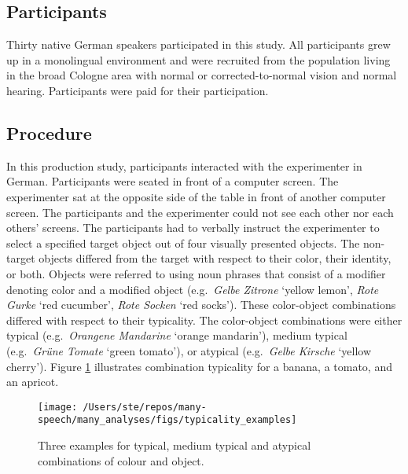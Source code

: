 \documentclass[
  12pt,
]{article}
\begin{document}
\hypertarget{participants}{%
\subsection{Participants}\label{participants}}

Thirty native German speakers participated in this study.
All participants grew up in a monolingual environment and were recruited from the population living in the broad Cologne area with normal or corrected-to-normal vision and normal hearing.
Participants were paid for their participation.

\hypertarget{procedure}{%
\subsection{Procedure}\label{procedure}}

In this production study, participants interacted with the experimenter in German.
Participants were seated in front of a computer screen.
The experimenter sat at the opposite side of the table in front of another computer screen.
The participants and the experimenter could not see each other nor each others' screens.
The participants had to verbally instruct the experimenter to select a specified target object out of four visually presented objects.
The non-target objects differed from the target with respect to their color, their identity, or both.
Objects were referred to using noun phrases that consist of a modifier denoting color and a modified object (e.g.~\emph{Gelbe Zitrone} `yellow lemon', \emph{Rote Gurke} `red cucumber', \emph{Rote Socken} `red socks').
These color-object combinations differed with respect to their typicality.
The color-object combinations were either typical (e.g.~\emph{Orangene Mandarine} `orange mandarin'), medium typical (e.g.~\emph{Grüne Tomate} `green tomato'), or atypical (e.g.~\emph{Gelbe Kirsche} `yellow cherry').
Figure \ref{fig:image0} illustrates combination typicality for a banana, a tomato, and an apricot.

\begin{figure}[tbp]

{\centering \texttt{[image: /Users/ste/repos/many-speech/many\_analyses/figs/typicality\_examples]} 

}

\caption{Three examples for typical, medium typical and atypical combinations of colour and object.}\label{fig:image0}
\end{figure}
\end{document}

